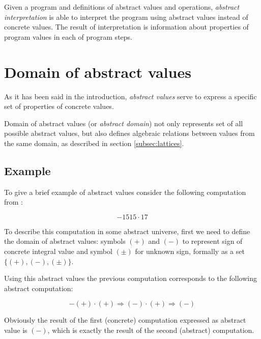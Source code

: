 \documentclass[12pt,oneside,draft]{fithesis2}
\begin{document}
\vspace{1\baselineskip} %

Given a program and definitions of abstract values and operations, \textit{abstract interpretation} is able to interpret the program using abstract values instead of concrete values. The result of interpretation is information about properties of program values in each of program steps.


\section{Domain of abstract values}

As it has been said in the introduction, \textit{abstract values} serve to express a specific set of properties of concrete values.

Domain of abstract values (or \textit{abstract domain}) not only represents set of all possible abstract values, but also defines algebraic relations between values from the same domain, as described in section \ref{subsec:lattices}.

\subsection{Example}\label{sec:example}

To give a brief example of abstract values consider the following computation from \cite{CousotCousot77-1}:

\[ -1515 \cdot 17 \]

To describe this computation in some abstract universe, first we need to define the domain of abstract values: symbols $(+)$ and $(-)$ to represent sign of concrete integral value and symbol $(\pm)$ for unknown sign, formally as a set $\{(+), (-), (\pm)\}$.

Using this abstract values the previous computation corresponds to the following abstract computation:

\[ -(+) \cdot (+) \Rightarrow (-) \cdot (+) \Rightarrow (-) \]

Obviously the result of the first (concrete) computation expressed as abstract value is $(-)$, which is exactly the result of the second (abstract) computation.
\end{document}
